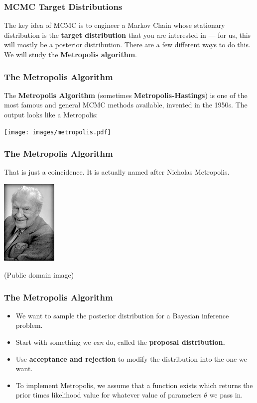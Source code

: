 \documentclass{beamer}
\begin{document}
\begin{frame}
\frametitle{MCMC Target Distributions}
The key idea of MCMC is to engineer a Markov Chain whose stationary distribution
is the {\bf target distribution} that you are interested in --- for us, this
will mostly be a posterior distribution. There are a few different ways to do
this. We will study the {\bf Metropolis algorithm}.

\end{frame}




\begin{frame}
\frametitle{The Metropolis Algorithm}
The {\bf Metropolis Algorithm} (sometimes {\bf Metropolis-Hastings})
is one of the most famous and general
MCMC methods available, invented in the 1950s. The output looks like a Metropolis:
\begin{center}
\texttt{[image: images/metropolis.pdf]}
\end{center}

\end{frame}

\begin{frame}
\frametitle{The Metropolis Algorithm}
That is just a coincidence.
It is actually named after Nicholas Metropolis.

\begin{center}
\includegraphics[width=0.2\textwidth]{images/nicholas_metropolis.png}

(Public domain image)
\end{center}

\end{frame}


\begin{frame}
\frametitle{The Metropolis Algorithm}
\begin{itemize}
\item We want to sample the posterior distribution for a Bayesian inference problem. \pause
\item Start with something we {\em can} do, called the {\bf proposal distribution.}\pause
\item Use {\bf acceptance and rejection} to modify the distribution into the
one we want.\pause
\item To implement Metropolis, we assume that a function exists which returns
the prior times likelihood value for whatever value of parameters $\theta$
we pass in.
\end{itemize}

\end{frame}
\end{document}
